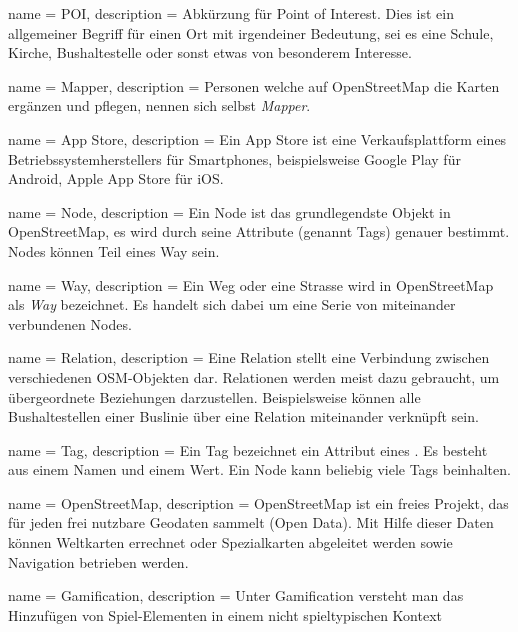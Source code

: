  {
	name = POI,
	description = {Abkürzung für Point of Interest. Dies ist ein allgemeiner Begriff für einen Ort mit irgendeiner Bedeutung, sei es eine Schule, Kirche, Bushaltestelle oder sonst etwas von besonderem Interesse.\cite{ba-kort-2012}}
}

 {
	name = Mapper,
	description = {Personen welche auf OpenStreetMap die Karten ergänzen und pflegen, nennen sich selbst \emph{Mapper}.\cite{ba-kort-2012}}
}

 {
	name = App Store,
	description = {Ein App Store ist eine Verkaufsplattform eines Betriebssystemherstellers für Smartphones, beispielsweise Google Play für Android, Apple App Store für iOS.\cite{ba-kort-2012}}
}

 {
	name = Node,
	description = {Ein Node ist das grundlegendste Objekt in OpenStreetMap, es wird durch seine Attribute (genannt \glspl{Tag}) genauer bestimmt. Nodes können Teil eines \gls{Way} sein.\cite{ba-kort-2012}}
}

 {
	name = Way,
	description = {Ein Weg oder eine Strasse wird in OpenStreetMap als \emph{Way} bezeichnet. Es handelt sich dabei um eine Serie von miteinander verbundenen Nodes.\cite{ba-kort-2012}}
}

 {
	name = Relation,
	description = {Eine Relation stellt eine Verbindung zwischen verschiedenen OSM-Objekten dar. Relationen werden meist dazu gebraucht, um übergeordnete Beziehungen darzustellen. Beispielsweise können alle Bushaltestellen einer Buslinie über eine Relation miteinander verknüpft sein.\cite{ba-kort-2012}}
}

 {
	name = Tag,
	description = {Ein Tag bezeichnet ein Attribut eines . Es besteht aus einem Namen und einem Wert. Ein \gls{Node} kann beliebig viele Tags beinhalten.\cite{ba-kort-2012}}
}

 {
	name = OpenStreetMap,
	description = {OpenStreetMap ist ein freies Projekt, das für jeden frei nutzbare Geodaten sammelt (Open Data). Mit Hilfe dieser Daten können Weltkarten errechnet oder Spezialkarten abgeleitet werden sowie Navigation betrieben werden.\cite{ba-kort-2012}}
}

 {
	name = Gamification,
	description = {Unter Gamification versteht man das Hinzufügen von Spiel-Elementen in einem nicht spieltypischen Kontext\cite{for-the-win.}}
}

